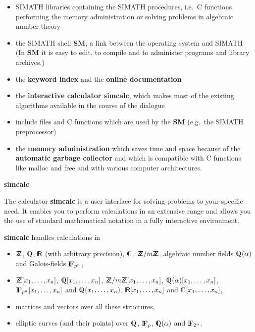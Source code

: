 \noindent
\begin{itemize}
\item SIMATH libraries containing the SIMATH procedures, i.e.\ 
C functions performing the memory administration or 
solving problems in algebraic number theory

\item the SIMATH shell {\bf SM}, a link between the operating 
system and SIMATH (In {\bf SM} it is easy to edit, to compile
and to administer programs and library archives.)

\item the {\bf keyword index} and the {\bf online documentation}

\item the {\bf interactive calculator simcalc},
which makes most of the existing algorithms available in the course 
of the dialogue

\item include files and C functions which are used by the {\bf SM} 
(e.g.\ the SIMATH preprocessor)

\item the {\bf memory administration} which saves time and space
because of the {\bf automatic garbage collector} and which is compatible
with C functions like malloc and free and with various computer 
architectures.
\end{itemize}
 
\newpage
\noindent
\begin{center}
{\Large {\bf simcalc}}
\end{center}

\vspace{0.4cm}

\noindent
The calculator {\bf simcalc} is a user interface for solving problems
to your specific need. It enables you to perform calculations in an
extensive range and allows you the use of standard mathematical
notation in a fully interactive environment. 

\vspace{0.4cm}

\noindent
{\bf simcalc} handles calculations in
\begin{itemize}
\item ${{\sf Z}\hspace{-1.3mm}{\sf Z}}$, $\Q$, $\R$ (with arbitrary precision), $\C$,
${{\sf Z}\hspace{-1.3mm}{\sf Z}}/m{{\sf Z}\hspace{-1.3mm}{\sf Z}}$, algebraic number fields $\Q(\alpha)$ and Galois-fields ${\rm{I\!F}}_{p^n}$,

\item ${{\sf Z}\hspace{-1.3mm}{\sf Z}}[x_1,\ldots ,x_n]$, $\Q[x_1,\ldots ,x_n]$, 
${{\sf Z}\hspace{-1.3mm}{\sf Z}}/m{{\sf Z}\hspace{-1.3mm}{\sf Z}}[x_1,\ldots ,x_n]$, 
$\Q(\alpha)[x_1,\ldots ,x_n]$, ${\rm{I\!F}}_{p^n}[x_1,\ldots ,x_n]$
and $\Q(x_1,\ldots ,x_n)$, $\R[x_1,\ldots ,x_n]$ and $\C[x_1,
\ldots ,x_n]$,

\item matrices and vectors over all these structures,

\item elliptic curves (and their points) over $\Q$, ${\rm{I\!F}}_p$, $\Q(\alpha)$ and ${\rm{I\!F}}_{2^n}$.

\end{itemize}

